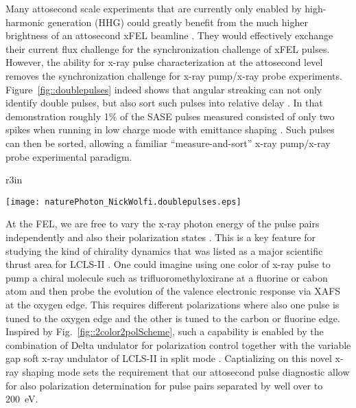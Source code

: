 
Many attosecond scale experiments that are currently only enabled by high-harmonic generation (HHG)\cite{Lewenstein1994,Hentschel2001,attoclock2008,Chen2014,Biegert2014,Schmidt2016,Biegert2016,WornerSci2017,Zenghu2017} could greatly benefit from the much higher brightness of an attosecond xFEL beamline \cite{Ding2009,Xiang2009,xLEAP}.
They would effectively exchange their current flux challenge for the synchronization challenge of xFEL pulses.
However, the ability for x-ray pulse characterization at the attosecond level removes the synchronization challenge for x-ray pump/x-ray probe experiments.
Figure~\ref{fig::doublepulses} indeed shows that angular streaking can not only identify double pulses, but also sort such pulses into relative delay \cite{Nick2018}.
In that demonstration roughly 1\% of the SASE pulses measured consisted of only two spikes when running in low charge mode with emittance shaping \cite{EmmaFoil,Ding2015}.
Such pulses can then be sorted, allowing a familiar ``measure-and-sort'' x-ray pump/x-ray probe experimental paradigm.

\begin{wrapfigure}[12]{r}{3in}
\centerline{\texttt{[image: naturePhoton\_NickWolfi.doublepulses.eps]}}
\vspace{-0.5\baselineskip}
\caption{\label{fig::doublepulses}Reproduced from Ref.~\cite{Nick2018}.
}
\end{wrapfigure}

At the FEL, we are free to vary the x-ray photon energy of the pulse pairs independently \cite{Lutman13_twocolor,LutmanFreshSlice2016} and also their polarization states \cite{Lutman2016,Dichroism2016}.
This is a key feature for studying the kind of chirality dynamics that was listed as a major scientific thrust area for LCLS-II \cite{lcls2_opportunities}.
One could imagine using one color of x-ray pulse to pump a chiral molecule such as trifluoromethyloxirane \cite{Ilchen2017} at a fluorine or cabon atom and then probe the evolution of the valence electronic response via XAFS at the oxygen edge.
This requires different polarizations \cite{Lutman2016,Dichroism2016} where also one pulse is tuned to the oxygen edge and the other is tuned to the carbon or fluorine edge.
Inspired by Fig.~\ref{fig::2color2polScheme}, such a capability is enabled by the combination of Delta undulator for polarization control together with the variable gap soft x-ray undulator of LCLS-II in split mode \cite{Lutman13_twocolor,LutmanFreshSlice2016}.
Captializing on this novel x-ray shaping mode sets the requirement that our attosecond pulse diagnostic allow for also polarization determination for pulse pairs separated by well over to 200~eV.

